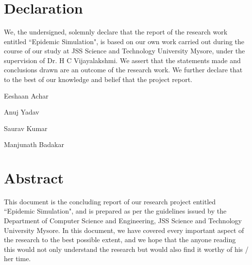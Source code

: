 \documentclass[12pt, a4paper]{extarticle}
\begin{document}
    \newpage
    \section*{Declaration}
        \paragraph{} We, the undersigned, solemnly declare that the report of the research work entitled ``Epidemic Simulation", is based on our own work carried out during the course of our study at JSS Science and Technology University Mysore, under the supervision of Dr. H C Vijayalakshmi. We assert that the statements made and conclusions drawn are an outcome of the research work. We further declare that to the best of our knowledge and belief that the project report.
        
        \vspace{5in}
        \hspace*{4in} Eeshaan Achar
        
        \vspace{0.75in}
        \hspace*{4in} Anuj Yadav
        
        \vspace{0.75in}
        \hspace*{4in} Saurav Kumar
        
        \vspace{0.75in}
        \hspace*{4in} Manjunath Badakar

	\newpage
    \section*{Abstract}
        \paragraph{} This document is the concluding report of our research project entitled ``Epidemic Simulation", and is prepared as per the guidelines issued by the Department of Computer Science and Engineering, JSS Science and Technology University Mysore. In this document, we have covered every important aspect of the research to the best possible extent, and we hope that the anyone reading this would not only understand the research but would also find it worthy of his / her time.
    
    \newpage
\end{document}
